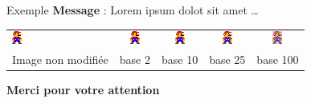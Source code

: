 \documentclass{beamer}
\begin{document}
    \begin{frame}{Exemple}%
        \textbf{Message} : Lorem ipsum dolot sit amet \ldots

        \begin{center}
            \begin{tabular}{p{53pt}cccc}
                \includegraphics[scale=4.5]{pics/mario_0.png}
                &
                \includegraphics[scale=4.5]{pics/mario_lorem_2.png}
                &
                \includegraphics[scale=4.5]{pics/mario_lorem_10.png}
                &
                \includegraphics[scale=4.5]{pics/mario_lorem_25.png}
                &
                \includegraphics[scale=4.5]{pics/mario_lorem_100.png}
                \\
                Image non modifiée
                & base 2
                & base 10
                & base 25
                & base 100
            \end{tabular}
        \end{center}
    \end{frame}%

    \begin{frame}%
        \begin{center}
            \large{\bf Merci pour votre attention}
        \end{center}
    \end{frame}%
    
\end{document}
